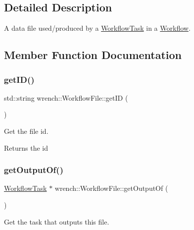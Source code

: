 \subsection{Detailed Description}
A data file used/produced by a \hyperlink{classwrench_1_1_workflow_task}{Workflow\+Task} in a \hyperlink{classwrench_1_1_workflow}{Workflow}. 

\subsection{Member Function Documentation}
\mbox{\label{classwrench_1_1_workflow_file_acafb99b2fc9a9482849c02af882d373f}} 
\subsubsection{\texorpdfstring{get\+I\+D()}{getID()}}
{\footnotesize\ttfamily std\+::string wrench\+::\+Workflow\+File\+::get\+ID (\begin{DoxyParamCaption}{ }\end{DoxyParamCaption})}



Get the file id. 

\begin{DoxyReturn}{Returns}
the id 
\end{DoxyReturn}
\mbox{\label{classwrench_1_1_workflow_file_a37f8fb29dac0d933bc0ae7d138baad31}} 
\subsubsection{\texorpdfstring{get\+Output\+Of()}{getOutputOf()}}
{\footnotesize\ttfamily \hyperlink{classwrench_1_1_workflow_task}{Workflow\+Task} $\ast$ wrench\+::\+Workflow\+File\+::get\+Output\+Of (\begin{DoxyParamCaption}{ }\end{DoxyParamCaption})}



Get the task that outputs this file. 

